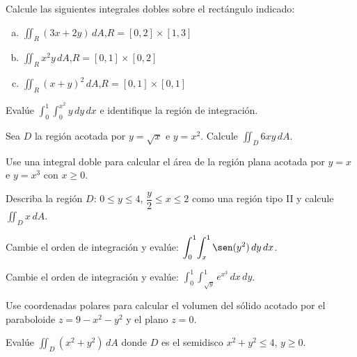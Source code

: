 
\begin{prob}
Calcule las siguientes integrales dobles sobre el rectángulo indicado:
\begin{enumerate}[a)]
    \item $\displaystyle\iint_R (3x+2y)\,dA$,\quad $R=[0,2]\times[1,3]$
    \item $\displaystyle\iint_R x^2 y\,dA$,\quad $R=[0,1]\times[0,2]$
    \item $\displaystyle\iint_R (x+y)^2\,dA$,\quad $R=[0,1]\times[0,1]$
\end{enumerate}
\end{prob}

\begin{prob}
Evalúe $\displaystyle\int_0^1\!\int_0^{x^2} y\,dy\,dx$ e identifique la región de integración.
\end{prob}


\begin{prob}
Sea $D$ la región acotada por $y=\sqrt{x}$ e $y=x^2$. Calcule $\displaystyle\iint_D 6xy\,dA$.
\end{prob}

\begin{prob}
Use una integral doble para calcular el área de la región plana acotada por $y=x$ e $y=x^3$ con $x\geq 0$.
\end{prob}

\begin{prob}
Describa la región $D$: $0\leq y\leq 4$, $\dfrac{y}{2}\leq x\leq 2$ como una región tipo II y calcule $\displaystyle\iint_D x\,dA$.
\end{prob}


\begin{prob}
Cambie el orden de integración y evalúe:
$\displaystyle\int_0^1\!\int_x^1 \sen(y^2)\,dy\,dx$.
\end{prob}

\begin{prob}
Cambie el orden de integración y evalúe:
$\displaystyle\int_0^1\!\int_{\sqrt{y}}^1 e^{x^3}\,dx\,dy$.
\end{prob}

\begin{prob}
Use coordenadas polares para calcular el volumen del sólido acotado por el paraboloide $z=9-x^2-y^2$ y el plano $z=0$.
\end{prob}

\begin{prob}
Evalúe $\displaystyle\iint_D (x^2+y^2)\,dA$ donde $D$ es el semidisco $x^2+y^2\leq 4$, $y\geq 0$.
\end{prob}


